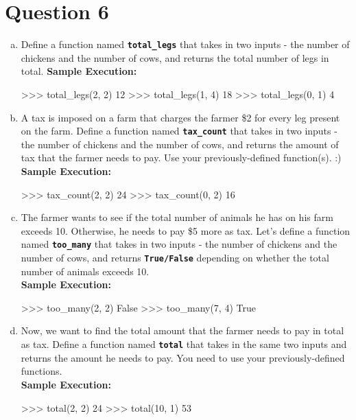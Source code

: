 \section{Question 6}
\begin{enumerate}[(a)]
\item Define a function named \texttt{\bfseries total\_legs} that takes in two inputs - the number of chickens and the number of cows,
and returns the total number of legs in total.
\newpage
\textbf{Sample Execution:}
\begin{python}
>>> total_legs(2, 2)
12
>>> total_legs(1, 4)
18
>>> total_legs(0, 1)
4
\end{python}

\item A tax is imposed on a farm that charges the farmer \$2 for every leg present on the farm. Define a function named
\texttt{\bfseries tax\_count} that takes in two inputs - the number of chickens and the number of cows, and returns the amount of tax that
the farmer needs to pay. Use your previously-defined function(s). :) \\
\textbf{Sample Execution:}
\begin{python}
>>> tax_count(2, 2)
24
>>> tax_count(0, 2)
16
\end{python}
  
\item The farmer wants to see if the total number of animals he has on his farm exceeds 10. Otherwise, he needs to pay \$5
more as tax. Let’s define a function named \texttt{\bfseries too\_many} that takes in two inputs - the number of chickens and the number of cows,
and returns \texttt{\bfseries True/False} depending on whether the total number of animals exceeds 10. \\
\textbf{Sample Execution:}
\begin{python}
>>> too_many(2, 2)
False
>>> too_many(7, 4)
True
\end{python}

\item Now, we want to find the total amount that the farmer needs to pay in total as tax. Define a function named \texttt{\bfseries total}
that takes in the same two inputs and returns the amount he needs to pay. You need to use your previously-defined functions. \\
\textbf{Sample Execution:}
\begin{python}
>>> total(2, 2)
24
>>> total(10, 1)
53
\end{python}
\end{enumerate}

